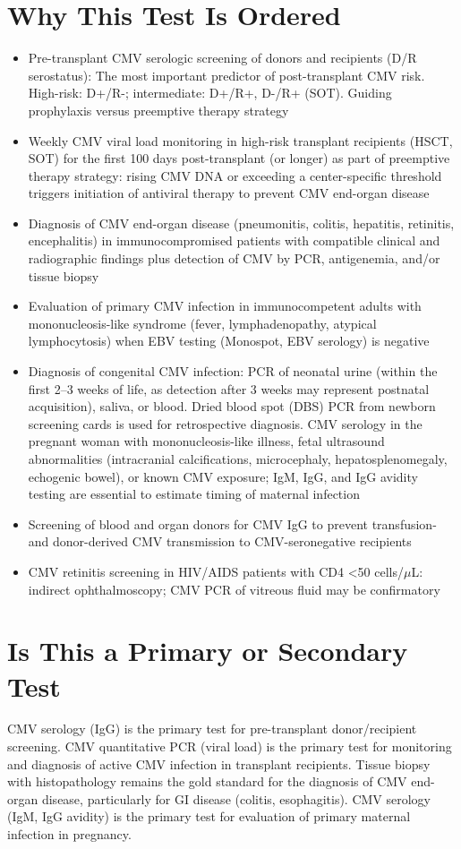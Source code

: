 \section*{Why This Test Is Ordered}
\begin{itemize}
  \item Pre-transplant CMV serologic screening of donors and recipients (D/R serostatus): The most important predictor of post-transplant CMV risk. High-risk: D+/R-; intermediate: D+/R+, D-/R+ (SOT). Guiding prophylaxis versus preemptive therapy strategy
  \item Weekly CMV viral load monitoring in high-risk transplant recipients (HSCT, SOT) for the first 100 days post-transplant (or longer) as part of preemptive therapy strategy: rising CMV DNA or exceeding a center-specific threshold triggers initiation of antiviral therapy to prevent CMV end-organ disease
  \item Diagnosis of CMV end-organ disease (pneumonitis, colitis, hepatitis, retinitis, encephalitis) in immunocompromised patients with compatible clinical and radiographic findings plus detection of CMV by PCR, antigenemia, and/or tissue biopsy
  \item Evaluation of primary CMV infection in immunocompetent adults with mononucleosis-like syndrome (fever, lymphadenopathy, atypical lymphocytosis) when EBV testing (Monospot, EBV serology) is negative
  \item Diagnosis of congenital CMV infection: PCR of neonatal urine (within the first 2--3 weeks of life, as detection after 3 weeks may represent postnatal acquisition), saliva, or blood. Dried blood spot (DBS) PCR from newborn screening cards is used for retrospective diagnosis. CMV serology in the pregnant woman with mononucleosis-like illness, fetal ultrasound abnormalities (intracranial calcifications, microcephaly, hepatosplenomegaly, echogenic bowel), or known CMV exposure; IgM, IgG, and IgG avidity testing are essential to estimate timing of maternal infection
  \item Screening of blood and organ donors for CMV IgG to prevent transfusion- and donor-derived CMV transmission to CMV-seronegative recipients
  \item CMV retinitis screening in HIV/AIDS patients with CD4 <50 cells/$\mu$L: indirect ophthalmoscopy; CMV PCR of vitreous fluid may be confirmatory
\end{itemize}

\section*{Is This a Primary or Secondary Test}
CMV serology (IgG) is the primary test for pre-transplant donor/recipient screening. CMV quantitative PCR (viral load) is the primary test for monitoring and diagnosis of active CMV infection in transplant recipients. Tissue biopsy with histopathology remains the gold standard for the diagnosis of CMV end-organ disease, particularly for GI disease (colitis, esophagitis). CMV serology (IgM, IgG avidity) is the primary test for evaluation of primary maternal infection in pregnancy.

